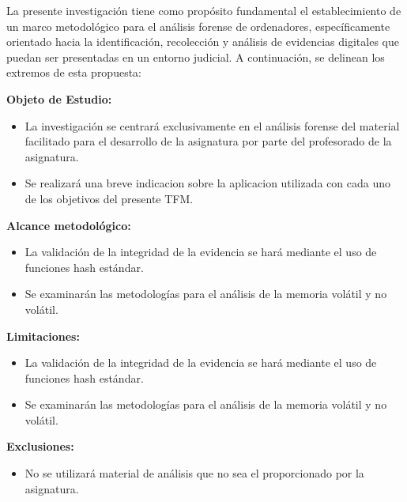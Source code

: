 La presente investigación tiene como propósito fundamental el establecimiento de un marco metodológico para el análisis forense de ordenadores, específicamente orientado hacia la identificación, recolección y análisis de evidencias digitales que puedan ser presentadas en un entorno judicial. A continuación, se delinean los extremos de esta propuesta:

\textbf{Objeto de Estudio:}

\begin{itemize}
  \item La investigación se centrará exclusivamente en el análisis forense del material facilitado para el desarrollo de la asignatura por parte del profesorado de la asignatura.
  \item Se realizará una breve indicacion sobre la aplicacion utilizada con cada uno de los objetivos del presente TFM.
\end{itemize}


\textbf{Alcance metodológico:}

\begin{itemize}
  \item La validación de la integridad de la evidencia se hará mediante el uso de funciones hash estándar.
  \item Se examinarán las metodologías para el análisis de la memoria volátil y no volátil.
\end{itemize}


\textbf{Limitaciones:}

\begin{itemize}
  \item La validación de la integridad de la evidencia se hará mediante el uso de funciones hash estándar.
  \item Se examinarán las metodologías para el análisis de la memoria volátil y no volátil.
\end{itemize}


\textbf{Exclusiones:}

\begin{itemize}
  \item No se utilizará material de análisis que no sea el proporcionado por la asignatura.
\end{itemize}


